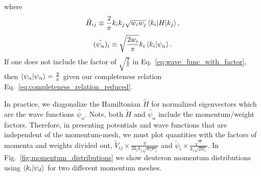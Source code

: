 \documentclass[preprintnumbers,floatfix,aps,prc,preprint,nofootinbib]{revtex4-1}
\begin{document}
%
where
%
\begin{eqnarray}
    \label{eq:hamiltonian_with_factor}
    \tilde{H}_{ij} \equiv \frac{2}{\pi} k_i k_j \sqrt{w_i w_j} \mel{k_i}{H}{k_j},
\end{eqnarray}
%
\begin{eqnarray}
    \label{eq:wave_func_with_factor}
    (\tilde{\psi_{\alpha}})_i \equiv \sqrt{\frac{2 w_i}{\pi}} k_i \bra{k_i} \ket{\psi_{\alpha}}.
\end{eqnarray}
%
If one does not include the factor of $\sqrt{\frac{2}{\pi}}$ in Eq.~\eqref{eq:wave_func_with_factor}, then $\bra{\psi_{\alpha}} \ket{\psi_{\alpha}} = \frac{2}{\pi}$ given our completeness relation Eq.~\eqref{eq:completeness_relation_reduced}.


In practice, we diagonalize the Hamiltonian $\tilde{H}$ for normalized eigenvectors which are the wave functions $\tilde{\psi_{\alpha}}$.
Note, both $\tilde{H}$ and $\tilde{\psi_{\alpha}}$ include the momentum/weight factors.
Therefore, in presenting potentials and wave functions that are independent of the momentum-mesh, we must plot quantities with the factors of momenta and weights divided out, $\tilde{V}_{ij} \times \frac{\pi}{2 k_i k_j \sqrt{w_i w_j}}$ and $\tilde{\psi}_{i} \times \frac{\sqrt{\pi}}{k_i \sqrt{2 w_i}}$. In Fig.~\ref{fig:momentum_distributions} we show deuteron momentum distributions using $\bra{k_i} \ket{\psi_d}$ for two different momentum meshes.
\end{document}
